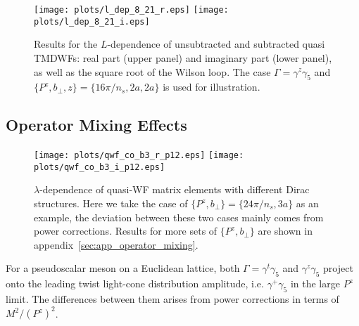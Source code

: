 \documentclass[prd,aps,twocolumn,preprintnumbers, showpacs, nofootinbib,superscriptaddress,notitlepage]{revtex4-1}
\newcommand\bl{\color{blue}}
\begin{document}
\begin{figure}
\centering
\texttt{[image: plots/l\_dep\_8\_21\_r.eps]}
\texttt{[image: plots/l\_dep\_8\_21\_i.eps]}
\caption{Results for the $L$-dependence of  unsubtracted and subtracted quasi TMDWFs:  real part (upper panel) and imaginary part (lower panel), as well as the square root of the Wilson loop. The {\bl case} $\Gamma=\gamma^z\gamma_5$ and $\{P^z,b_{\perp}, z\}=\{16\pi/n_s,2a,2a\}$ is used for illustration. }
\label{fig:WilsonLooprenormalization}
\end{figure}
 
\subsection{Operator Mixing Effects}
\label{sec:operator}


\begin{figure}
\centering
\texttt{[image: plots/qwf\_co\_b3\_r\_p12.eps]}
\texttt{[image: plots/qwf\_co\_b3\_i\_p12.eps]}
\caption{$\lambda$-dependence of quasi-WF matrix elements with different Dirac structures. Here we take the case of $\{P^z,b_{\perp}\}=\{24\pi/n_s,3a\}$ as an example, the deviation between these two cases mainly comes from {\bl power corrections. Results for} more sets of $\{P^z,b_{\perp}\}$ are shown in appendix~\ref{sec:app_operator_mixing}.}
    \label{fig:qwf_coordinate}
\end{figure}


For a pseudoscalar meson on a Euclidean lattice, both $\Gamma=\gamma^t\gamma_5$ and $\gamma^z\gamma_5$ {\bl  project}  onto the leading twist light-cone distribution amplitude, i.e. $\gamma^+\gamma_5$ in {\bl the} large $P^z$ limit. The differences  between them arises from power corrections in terms of $M^2/\left(P^z\right)^2$.
\end{document}
